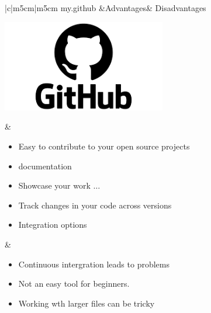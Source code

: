 \documentclass{article}
\begin{document}
	\begin{table}[h!]
		\centering
		\begin{tabular}{|c|m{5cm}|m{5cm}}
		\hline
		my.github &Advantages& Disadvantages\\
		\hline
		\begin{minipage}{0.4\linewidth}
			\includegraphics[width=\linewidth, height= 40mm]{git.png}
		\end{minipage}
		&
			\begin{itemize}
				\item Easy to contribute to your open source projects
				\item documentation
				\item Showcase your work $\ldots$
				\item Track changes in your code across versions
				\item Integration options
			\end{itemize}
		&
			\begin{itemize}
				\item Continuous intergration leads to problems
				\item Not an easy tool for beginners.
				\item Working wth larger files can be tricky
			\end{itemize}
		\\
		\hline
		\end{tabular}
	\caption{Github Analysis}
	\label{tbl:mygithub}
	\end{table}
\end{document}
